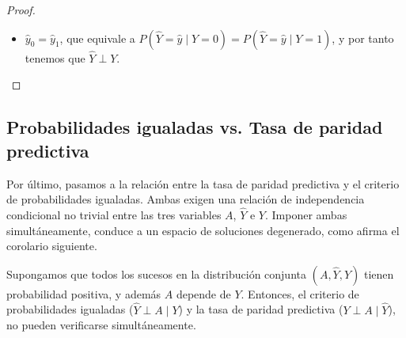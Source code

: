\documentclass[oneside,openright,titlepage,numbers=noenddot,openany,headinclude,footinclude=true,
cleardoublepage=empty,abstractoff,BCOR=5mm,paper=a4,fontsize=12pt,main=spanish]{scrreprt}
\begin{document}
\begin{proof}
\begin{itemize}
    \item $\hat{y}_0=\hat{y}_1$, que equivale a $P(\hat{Y}=\hat{y}\mid Y=0)=P(\hat{Y}=\hat{y}\mid Y=1)$, y por tanto tenemos que $\hat{Y}\perp Y$.
\end{itemize}


\end{proof}


\subsection{Probabilidades igualadas vs. Tasa de paridad predictiva}

Por último, pasamos a la relación entre la tasa de paridad predictiva y el criterio de probabilidades igualadas. Ambas exigen una relación de independencia condicional no trivial entre las tres variables $A$, $\hat{Y}$ e $Y$. Imponer ambas simultáneamente, conduce a un espacio de soluciones degenerado, como afirma el corolario siguiente.\\

\begin{corollary}
Supongamos que todos los sucesos en la distribución conjunta $(A,\hat{Y},Y)$ tienen probabilidad positiva, y además $A$ depende de $Y$. Entonces, el criterio de probabilidades igualadas ($\hat{Y}\perp A \mid Y$) y la tasa de paridad predictiva ($Y\perp A \mid \hat{Y}$), no pueden verificarse simultáneamente.
\label{cor:probpositiva}
\end{corollary}
\end{document}
